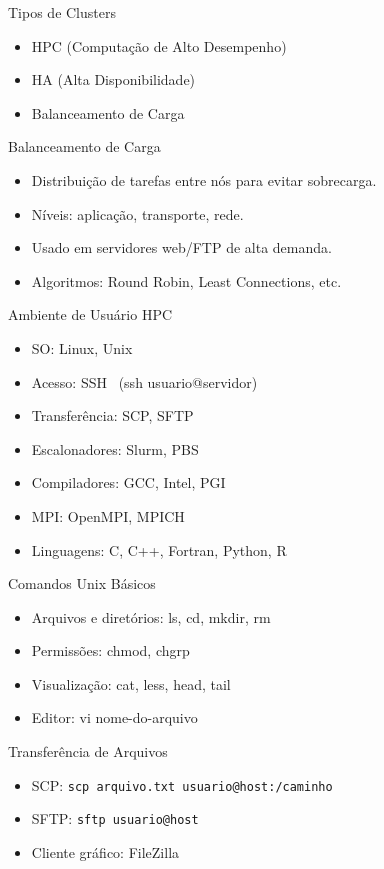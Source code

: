\documentclass{beamer}
\begin{document}
\begin{frame}{Tipos de Clusters}
\begin{itemize}
    \item HPC (Computação de Alto Desempenho)
    \item HA (Alta Disponibilidade)
    \item Balanceamento de Carga
\end{itemize}
\end{frame}

\begin{frame}{Balanceamento de Carga}
\begin{itemize}
    \item Distribuição de tarefas entre nós para evitar sobrecarga.
    \item Níveis: aplicação, transporte, rede.
    \item Usado em servidores web/FTP de alta demanda.
    \item Algoritmos: Round Robin, Least Connections, etc.
\end{itemize}
\end{frame}

\begin{frame}{Ambiente de Usuário HPC}
\begin{itemize}
    \item SO: Linux, Unix
    \item Acesso: SSH \ (ssh usuario@servidor)
    \item Transferência: SCP, SFTP
    \item Escalonadores: Slurm, PBS
    \item Compiladores: GCC, Intel, PGI
    \item MPI: OpenMPI, MPICH
    \item Linguagens: C, C++, Fortran, Python, R
\end{itemize}
\end{frame}

\begin{frame}{Comandos Unix Básicos}
\begin{itemize}
    \item Arquivos e diretórios: ls, cd, mkdir, rm
    \item Permissões: chmod, chgrp
    \item Visualização: cat, less, head, tail
    \item Editor: vi nome-do-arquivo
\end{itemize}
\end{frame}

\begin{frame}{Transferência de Arquivos}
\begin{itemize}
    \item SCP: \texttt{scp arquivo.txt usuario@host:/caminho}
    \item SFTP: \texttt{sftp usuario@host}
    \item Cliente gráfico: FileZilla
\end{itemize}
\end{frame}
\end{document}
